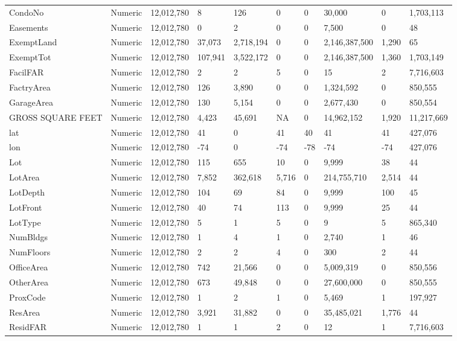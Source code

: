 \documentclass[12pt,]{article}
\begin{document}
\begin{table}
{\begin{tabular}[t]{llllllllll}
CondoNo & Numeric & 12,012,780 & 8 & 126 & 0 & 0 & 30,000 & 0 & 1,703,113\\
Easements & Numeric & 12,012,780 & 0 & 2 & 0 & 0 & 7,500 & 0 & 48\\
ExemptLand & Numeric & 12,012,780 & 37,073 & 2,718,194 & 0 & 0 & 2,146,387,500 & 1,290 & 65\\
\addlinespace
ExemptTot & Numeric & 12,012,780 & 107,941 & 3,522,172 & 0 & 0 & 2,146,387,500 & 1,360 & 1,703,149\\
FacilFAR & Numeric & 12,012,780 & 2 & 2 & 5 & 0 & 15 & 2 & 7,716,603\\
FactryArea & Numeric & 12,012,780 & 126 & 3,890 & 0 & 0 & 1,324,592 & 0 & 850,555\\
GarageArea & Numeric & 12,012,780 & 130 & 5,154 & 0 & 0 & 2,677,430 & 0 & 850,554\\
GROSS SQUARE FEET & Numeric & 12,012,780 & 4,423 & 45,691 & NA & 0 & 14,962,152 & 1,920 & 11,217,669\\
\addlinespace
lat & Numeric & 12,012,780 & 41 & 0 & 41 & 40 & 41 & 41 & 427,076\\
lon & Numeric & 12,012,780 & -74 & 0 & -74 & -78 & -74 & -74 & 427,076\\
Lot & Numeric & 12,012,780 & 115 & 655 & 10 & 0 & 9,999 & 38 & 44\\
LotArea & Numeric & 12,012,780 & 7,852 & 362,618 & 5,716 & 0 & 214,755,710 & 2,514 & 44\\
LotDepth & Numeric & 12,012,780 & 104 & 69 & 84 & 0 & 9,999 & 100 & 45\\
\addlinespace
LotFront & Numeric & 12,012,780 & 40 & 74 & 113 & 0 & 9,999 & 25 & 44\\
LotType & Numeric & 12,012,780 & 5 & 1 & 5 & 0 & 9 & 5 & 865,340\\
NumBldgs & Numeric & 12,012,780 & 1 & 4 & 1 & 0 & 2,740 & 1 & 46\\
NumFloors & Numeric & 12,012,780 & 2 & 2 & 4 & 0 & 300 & 2 & 44\\
OfficeArea & Numeric & 12,012,780 & 742 & 21,566 & 0 & 0 & 5,009,319 & 0 & 850,556\\
\addlinespace
OtherArea & Numeric & 12,012,780 & 673 & 49,848 & 0 & 0 & 27,600,000 & 0 & 850,555\\
ProxCode & Numeric & 12,012,780 & 1 & 2 & 1 & 0 & 5,469 & 1 & 197,927\\
ResArea & Numeric & 12,012,780 & 3,921 & 31,882 & 0 & 0 & 35,485,021 & 1,776 & 44\\
ResidFAR & Numeric & 12,012,780 & 1 & 1 & 2 & 0 & 12 & 1 & 7,716,603\\

\end{tabular}}
\end{table}
\end{document}

